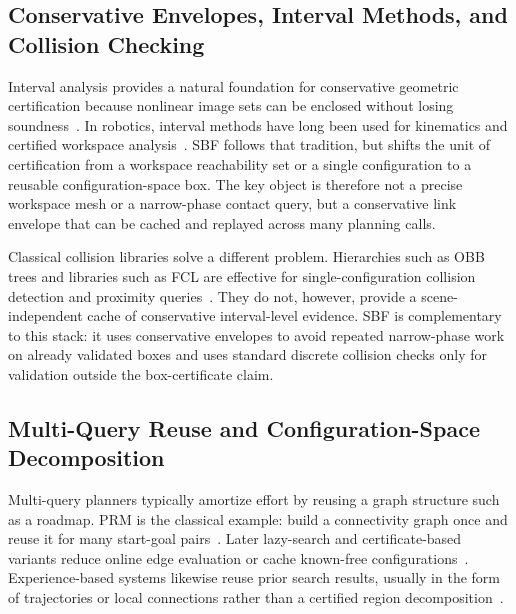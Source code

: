\documentclass[journal]{IEEEtran}
\begin{document}
\subsection{Conservative Envelopes, Interval Methods, and Collision Checking}

Interval analysis provides a natural foundation for conservative geometric
certification because nonlinear image sets can be enclosed without losing
soundness~\cite{moore2009introduction,jaulin2001applied}. In robotics, interval
methods have long been used for kinematics and certified workspace
analysis~\cite{merlet2004solving,merlet2009interval}. SBF follows that
tradition, but shifts the unit of certification from a workspace reachability
set or a single configuration to a reusable configuration-space box. The key
object is therefore not a precise workspace mesh or a narrow-phase contact
query, but a conservative link envelope that can be cached and replayed across
many planning calls.

Classical collision libraries solve a different problem. Hierarchies such as
OBB trees and libraries such as FCL are effective for single-configuration
collision detection and proximity queries~\cite{gottschalk1996obbtree,
pan2012fcl,gilbert1988fast}. They do not, however, provide a scene-independent
cache of conservative interval-level evidence. SBF is complementary to this stack:
it uses conservative envelopes to avoid repeated narrow-phase work on already
validated boxes and uses standard discrete collision checks only for validation
outside the box-certificate claim.

\subsection{Multi-Query Reuse and Configuration-Space Decomposition}

Multi-query planners typically amortize effort by reusing a graph structure such
as a roadmap. PRM is the classical example: build a connectivity graph once and
reuse it for many start-goal pairs~\cite{kavraki1996probabilistic,
bohlin2000path}. Later lazy-search and certificate-based variants reduce online
edge evaluation or cache known-free configurations~\cite{dellin2016unifying,
schmerling2015optimal}. Experience-based systems likewise reuse prior search
results, usually in the form of trajectories or local connections rather than a
certified region decomposition~\cite{coleman2014moveit}.
\end{document}
